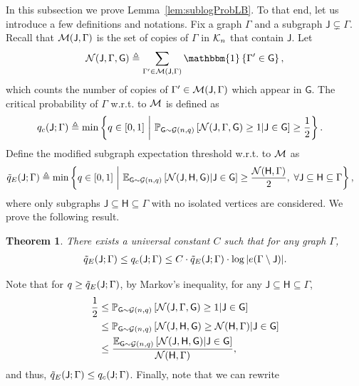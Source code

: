 \documentclass[12pt]{article}
\newtheorem{theorem}{Theorem}
\newcommand{\Ind}{\mathbbm{1}}
\newcommand{\E}{\mathbb{E}}
\def\P{{\mathbb P}}
\newcommand{\calG}{{\cal G}}
\newcommand{\calK}{{\cal K}}
\newcommand{\calM}{{\cal M}}
\newcommand{\calN}{{\cal N}}
\newcommand{\pp}[1]{\left[#1\right]}
\newcommand{\ppp}[1]{\left\{#1\right\}}
\newcommand{\s}[1]{\mathsf{#1}}
\begin{document}
In this subsection we prove Lemma~\ref{lem:sublogProbLB}. To that end, let us introduce a few definitions and notations. Fix a graph $\Gamma$ and a subgraph $\s{J} \subsetneq \Gamma$. Recall that $\calM(\s{J},\Gamma)$ is the set of copies of $\Gamma$ in $\calK_n$ that contain $\s{J}$. Let
\begin{align}
    \calN(\s{J},\Gamma,\s{G})\triangleq\sum_{\Gamma'\in\calM(\s{J},\Gamma)}\Ind\ppp{\Gamma'\in\s{G}},
\end{align}
which counts the number of copies of $\Gamma'\in\calM(\s{J},\Gamma)$ which appear in $\s{G}$. The critical probability of $\Gamma$ w.r.t. to $\calM$ is defined as
\begin{align}
    q_{c}(\s{J};\Gamma)&\triangleq\min\ppp{q\in[0,1] ~\bigg|~ \P_{\s{G}\sim \calG(n,q)}\pp{\calN(\s{J},\Gamma,\s{G})\geq 1\vert\s{J}\in\s{G}}\geq \frac{1}{2}}.\label{eqn:qcJGamma}
    \end{align}
Define the modified subgraph expectation threshold w.r.t. to $\calM$ as
\begin{align}
    \Tilde{q}_E(\s{J};\Gamma)&\triangleq\min\left\{q\in[0,1] ~\bigg|~ \E_{\s{G}\sim \calG(n,q)}\pp{\calN(\s{J},\s{H},\s{G})\vert\s{J}\in\s{G}}\geq \frac{\calN(\s{H},\Gamma)}{2},\;\forall\s{J}\subseteq\s{H}\subseteq \Gamma\right\},
\end{align} 
where only subgraphs $\s{J}\subseteq\s{H}\subseteq \Gamma$ with no isolated vertices are considered. We prove the following result.
\begin{theorem}\label{th:Zadik2} 
There exists a universal constant $C$ such that for any graph $\Gamma$, \begin{align}
    \Tilde{q}_E(\s{J};\Gamma)\leq q_{c}(\s{J};\Gamma)\leq C\cdot \Tilde{q}_E(\s{J};\Gamma)\cdot  \log|e(\Gamma\setminus\s{J})|.
\end{align}
\end{theorem}
Note that for $q\geq \Tilde{q}_E(\s{J};\Gamma)$, by Markov's inequality, for any $\s{J}\subseteq\s{H}\subseteq \Gamma$,
\begin{align}
    \frac{1}{2}&\leq \P_{\s{G}\sim \calG(n,q)}\pp{\calN(\s{J},\Gamma,\s{G})\geq 1\vert\s{J}\in\s{G}}\\
    &\leq \P_{\s{G}\sim \calG(n,q)}\pp{\calN(\s{J},\s{H},\s{G})\geq \calN(\s{H},\Gamma)\vert\s{J}\in\s{G}}\\
    &\leq \frac{\E_{\s{G}\sim \calG(n,q)}\pp{\calN(\s{J},\s{H},\s{G})\vert\s{J}\in\s{G}}}{\calN(\s{H},\Gamma)},
\end{align}
and thus, $\Tilde{q}_E(\s{J};\Gamma)\leq q_{c}(\s{J};\Gamma)$. Finally, note that we can rewrite
\end{document}
